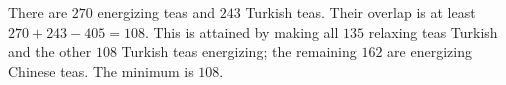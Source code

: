 There are $270$ energizing teas and $243$ Turkish teas. Their overlap is at least $270+243-405=108$. This is attained by making all $135$ relaxing teas Turkish and the other $108$ Turkish teas energizing; the remaining $162$ are energizing Chinese teas. The minimum is $\boxed{108}$.
